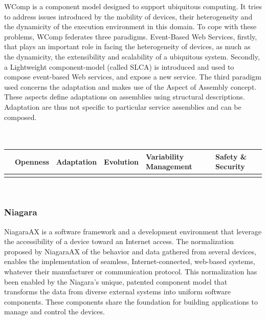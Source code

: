 WComp\cite{Ferry:2011uq,Tigli:2009} is a component model designed to support ubiquitous computing. It tries to address issues introduced by the mobility of devices, their heterogeneity and the dynamicity of the execution environment in this domain. To cope with these problems, WComp federates three paradigms. Event-Based Web Services, firstly, that plays an important role in facing the heterogeneity of devices, as much as the dynamicity, the extensibility and scalability of a ubiquitous system. Secondly, a Lightweight component-model (called SLCA) is introduced and used to compose event-based Web services, and expose a new service. The third paradigm used concerns the adaptation and makes use of the Aspect of Assembly concept. These aspects define adaptations on assemblies using structural descriptions. Adaptation are thus not specific to particular service assemblies and can be composed.\\

\\
 \\
\begin{tabular}{ >{\centering}m{}| >{\centering}m{} >{\centering}m{}| >{\centering}m{} >{\centering}m{}| >{\centering\arraybackslash}m{}}
{\tiny Interoperability} & {\tiny Openness} & {\tiny Adaptation} & {\tiny Evolution} & {\tiny Variability Management} & {\tiny Safety \& Security}\\
 \hline
  &  &  &  &  & \\ 
  \hline
\end{tabular}\\

\subsubsection{Niagara}

NiagaraAX is a software framework and a development environment that leverage the accessibility of a device toward an Internet access. 
The normalization proposed by NiagaraAX of the behavior and data gathered from several devices, enables the implementation of seamless, Internet-connected, web-based systems, whatever their manufacturer or communication protocol. This normalization has been enabled by the Niagara's unique, patented component model that transforms the data from diverse external systems into uniform software components.
These components share the foundation for building applications to manage and control the devices.\\

